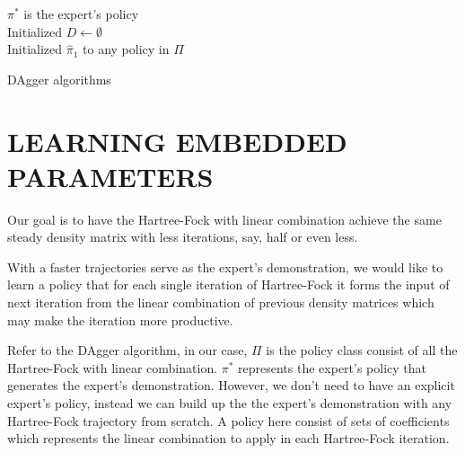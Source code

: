 \documentclass[twoside]{article}
\begin{document}
\begin{algorithm}[htb]
 $\pi^*$  is the expert’s policy \\
 Initialized $D \leftarrow \emptyset$ \\
 Initialized $\hat{\pi}_1$ to any policy in $\Pi$ \\
 \caption{DAgger algorithms}
\end{algorithm}




\section{LEARNING EMBEDDED PARAMETERS}

Our goal is to have the Hartree-Fock with linear combination achieve the same steady density matrix with less iterations, say, half or even less.  



% 

With a faster trajectories serve as the expert's demonstration, we would like to learn a policy that for each single iteration of Hartree-Fock it forms the input of next iteration from the linear combination of previous density matrices which may make the iteration more productive.   

Refer to the DAgger algorithm, in our case, $\Pi$ is the policy class consist of all the Hartree-Fock with linear combination. $\pi^*$ represents the expert's policy that generates the expert's demonstration. However, we don't need to have an explicit expert's policy, instead we can build up the the expert's demonstration with any Hartree-Fock trajectory from scratch. A policy here consist of sets of coefficients which represents the linear combination to apply in each Hartree-Fock iteration. 
\end{document}
